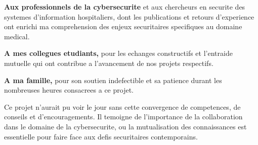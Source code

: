 \textbf{Aux professionnels de la cybersecurite} et aux chercheurs en securite des systemes d'information hospitaliers, dont les publications et retours d'experience ont enrichi ma comprehension des enjeux securitaires specifiques au domaine medical.

\vspace{0.5cm}

\textbf{A mes collegues etudiants,} pour les echanges constructifs et l'entraide mutuelle qui ont contribue a l'avancement de nos projets respectifs.

\vspace{0.5cm}

\textbf{A ma famille,} pour son soutien indefectible et sa patience durant les nombreuses heures consacrees a ce projet.

\vspace{1cm}

Ce projet n'aurait pu voir le jour sans cette convergence de competences, de conseils et d'encouragements. Il temoigne de l'importance de la collaboration dans le domaine de la cybersecurite, ou la mutualisation des connaissances est essentielle pour faire face aux defis securitaires contemporains.

\vspace{1cm}


\newpage
